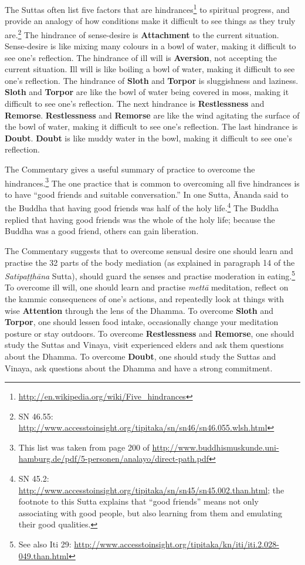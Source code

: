 The Suttas often list five factors that are hindrances\footnote{\url{http://en.wikipedia.org/wiki/Five_hindrances}} to spiritual progress, and provide an analogy of how conditions make it difficult to see things as they truly are.\footnote{SN 46.55: \url{http://www.accesstoinsight.org/tipitaka/sn/sn46/sn46.055.wlsh.html}} The hindrance of sense-desire is \textbf{Attachment} to the current situation. Sense-desire is like mixing many colours in a bowl of water, making it difficult to see one’s reflection. The hindrance of ill will is \textbf{Aversion}, not accepting the current situation. Ill will is like boiling a bowl of water, making it difficult to see one’s reflection. The hindrance of \textbf{Sloth} and \textbf{Torpor} is sluggishness and laziness. \textbf{Sloth} and \textbf{Torpor} are like the bowl of water being covered in moss, making it difficult to see one’s reflection. The next hindrance is \textbf{Restlessness} and \textbf{Remorse}. \textbf{Restlessness} and \textbf{Remorse} are like the wind agitating the surface of the bowl of water, making it difficult to see one’s reflection. The last hindrance is \textbf{Doubt}. \textbf{Doubt} is like muddy water in the bowl, making it difficult to see one’s reflection.

The Commentary gives a useful summary of practice to overcome the hindrances.\footnote{This list was taken from page 200 of \url{http://www.buddhismuskunde.uni-hamburg.de/pdf/5-personen/analayo/direct-path.pdf}} The one practice that is common to overcoming all five hindrances is to have “good friends and suitable conversation.” In one Sutta, Ānanda said to the Buddha that having good friends was half of the holy life.\footnote{SN 45.2: \url{http://www.accesstoinsight.org/tipitaka/sn/sn45/sn45.002.than.html}; the footnote to this Sutta explains that “good friends” means not only associating with good people, but also learning from them and emulating their good qualities.} The Buddha replied that having good friends was the whole of the holy life; because the Buddha was a good friend, others can gain liberation.

The Commentary suggests that to overcome sensual desire one should learn and practise the 32 parts of the body mediation (as explained in paragraph 14 of the \textit{Satipaṭṭhāna} Sutta), should guard the senses and practise moderation in eating.\footnote{See also Iti 29: \url{http://www.accesstoinsight.org/tipitaka/kn/iti/iti.2.028-049.than.html}} To overcome ill will, one should learn and practise \textit{mettā} meditation, reflect on the kammic consequences of one’s actions, and repeatedly look at things with wise \textbf{Attention} through the lens of the Dhamma. To overcome \textbf{Sloth} and \textbf{Torpor}, one should lessen food intake, occasionally change your meditation posture or stay outdoors. To overcome \textbf{Restlessness} and \textbf{Remorse}, one should study the Suttas and Vinaya, visit experienced elders and ask them questions about the Dhamma. To overcome \textbf{Doubt}, one should study the Suttas and Vinaya, ask questions about the Dhamma and have a strong commitment.

